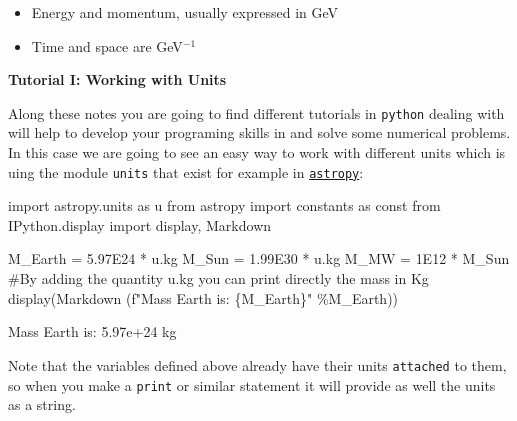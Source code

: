 \documentclass[
  letterpaper,
  DIV=11,
  numbers=noendperiod]{scrreprt}
\newenvironment{Shaded}{\begin{snugshade}}{\end{snugshade}}
\newcommand{\CommentTok}[1]{\textcolor[rgb]{0.37,0.37,0.37}{#1}}
\newcommand{\FloatTok}[1]{\textcolor[rgb]{0.68,0.00,0.00}{#1}}
\newcommand{\ImportTok}[1]{\textcolor[rgb]{0.00,0.46,0.62}{#1}}
\newcommand{\NormalTok}[1]{\textcolor[rgb]{0.00,0.23,0.31}{#1}}
\newcommand{\OperatorTok}[1]{\textcolor[rgb]{0.37,0.37,0.37}{#1}}
\newcommand{\SpecialCharTok}[1]{\textcolor[rgb]{0.37,0.37,0.37}{#1}}
\newcommand{\SpecialStringTok}[1]{\textcolor[rgb]{0.13,0.47,0.30}{#1}}
\providecommand{\tightlist}{%
  \setlength{\itemsep}{0pt}\setlength{\parskip}{0pt}}\usepackage{longtable,booktabs,array}
\begin{document}
\begin{itemize}
\tightlist
\item
  Energy and momentum, usually expressed in GeV
\item
  Time and space are GeV\(^{-1}\)
\end{itemize}

\begin{tcolorbox}[enhanced jigsaw, toprule=.15mm, colframe=quarto-callout-color-frame, bottomrule=.15mm, leftrule=.75mm, left=2mm, breakable, rightrule=.15mm, arc=.35mm, opacityback=0, colback=white]

\vspace{-3mm}\textbf{Tutorial I: Working with Units}\vspace{3mm}

Along these notes you are going to find different tutorials in
\texttt{python} dealing with will help to develop your programing skills
in and solve some numerical problems. In this case we are going to see
an easy way to work with different units which is uing the module
\texttt{units} that exist for example in
\href{http://astropy.readthedocs.org/en/latest/units/}{\texttt{astropy}}:

\begin{Shaded}
\begin{Highlighting}[]
\ImportTok{import}\NormalTok{ astropy.units }\ImportTok{as}\NormalTok{ u}
\ImportTok{from}\NormalTok{ astropy }\ImportTok{import}\NormalTok{ constants }\ImportTok{as}\NormalTok{ const}
\ImportTok{from}\NormalTok{ IPython.display }\ImportTok{import}\NormalTok{ display, Markdown}

\NormalTok{M\_Earth }\OperatorTok{=} \FloatTok{5.97E24} \OperatorTok{*}\NormalTok{ u.kg}
\NormalTok{M\_Sun }\OperatorTok{=} \FloatTok{1.99E30} \OperatorTok{*}\NormalTok{ u.kg}
\NormalTok{M\_MW  }\OperatorTok{=} \FloatTok{1E12} \OperatorTok{*}\NormalTok{ M\_Sun}
\CommentTok{\#By adding the quantity u.kg you can print directly the mass in Kg}
\NormalTok{display(Markdown (}\SpecialStringTok{f"Mass Earth is: }\SpecialCharTok{\{}\NormalTok{M\_Earth}\SpecialCharTok{\}}\SpecialStringTok{"} \OperatorTok{\%}\NormalTok{M\_Earth))}
\end{Highlighting}
\end{Shaded}

Mass Earth is: 5.97e+24 kg

Note that the variables defined above already have their units
\texttt{attached} to them, so when you make a \texttt{print} or similar
statement it will provide as well the units as a string.


\end{tcolorbox}
\end{document}
